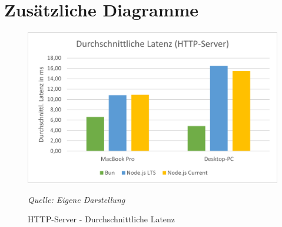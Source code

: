 \useportrait
\section{Zusätzliche Diagramme} \label{sec:benchmark-results-diagrams}

\begin{figure}[h!]
	\centering
	\includegraphics[width=\linewidth]{./images/httpServerAverageLatency.png}
	\caption{HTTP-Server - Durchschnittliche Latenz}
	\label{fig:httpServerAverageLatency}
	\textit{Quelle: Eigene Darstellung}
\end{figure}

